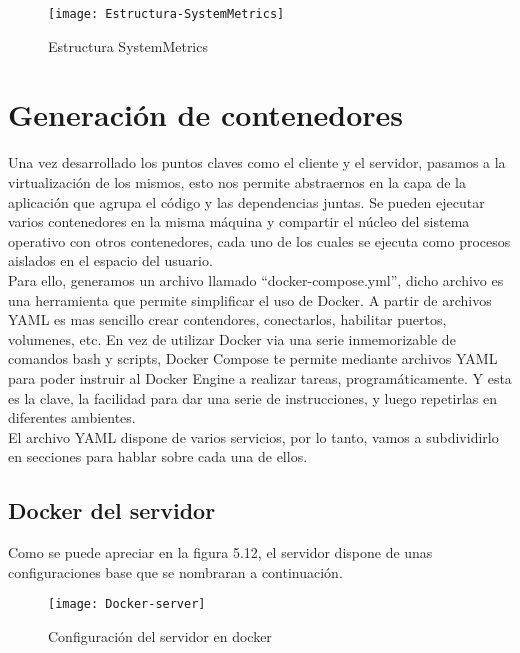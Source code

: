 \documentclass[ spanish, a4paper, 12pt, oneside]{report}
\begin{document}
\begin{figure}[!h]
   \centering
   \texttt{[image: Estructura-SystemMetrics]}\\
      \caption{\label{fig: Estructura SystemMetrics} Estructura SystemMetrics}
\end{figure}

\section{Generación de contenedores}
Una vez desarrollado los puntos claves como el cliente y el servidor, pasamos a la virtualización de los mismos, esto nos permite abstraernos en la capa de la aplicación que agrupa el código 
y las dependencias juntas. Se pueden ejecutar varios contenedores en la misma máquina y compartir el núcleo del sistema operativo con otros contenedores, cada uno de los cuales se ejecuta como 
procesos aislados en el espacio del usuario. \\

Para ello, generamos un archivo llamado ``docker-compose.yml'', dicho archivo es una herramienta que permite simplificar el uso de Docker. A partir de archivos YAML es mas sencillo crear contendores, 
conectarlos, habilitar puertos, volumenes, etc. En vez de utilizar Docker via una serie inmemorizable de comandos bash y scripts, Docker Compose te permite mediante archivos YAML para poder instruir al 
Docker Engine a realizar tareas, programáticamente. Y esta es la clave, la facilidad para dar una serie de instrucciones, y luego repetirlas en diferentes ambientes.\\

El archivo YAML dispone de varios servicios, por lo tanto, vamos a subdividirlo en secciones para hablar sobre cada una de ellos. \\

\subsection{Docker del servidor}

Como se puede apreciar en la figura 5.12, el servidor dispone de unas configuraciones base que se nombraran a continuación.\\

\begin{figure}[!h]
   \centering
   \texttt{[image: Docker-server]}\\
      \caption{\label{fig: Configuración del servidor en docker} Configuración del servidor en docker}
\end{figure}
\end{document}
